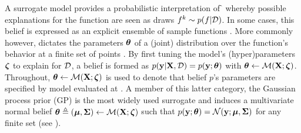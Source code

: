 A surrogate model \model{} provides a probabilistic interpretation of \f{} whereby possible explanations for the function are seen as draws \(f^{k} \sim p(f | \mathcal{D})\). In some cases, this belief is expressed as an explicit ensemble of sample functions \cite{hernandez-nips14,springenberg2016bayesian,wang2017max}. 
% 
More commonly however, \model{} dictates the parameters \(\boldsymbol{\theta}\) of a (joint) distribution over the function's behavior at a finite set of points \X{}. 
% 
By first tuning the model's (hyper)parameters \(\boldsymbol{\zeta}\) to explain for \(\mathcal{D}\), a belief is formed as \(p(\mathbf{y}|\mathbf{X}, \mathcal{D}) = p(\mathbf{y}; \boldsymbol{\theta})\) with \(\boldsymbol{\theta} \gets \mathcal{M}(\mathbf{X}; \boldsymbol{\zeta})\). Throughout, \(\boldsymbol{\theta} \gets \mathcal{M}(\mathbf{X}; \boldsymbol{\zeta})\) is used to denote that belief \(p\)'s parameters \rparams{} are specified by model \model{} evaluated at \X.
% 
A member of this latter category, the Gaussian process prior (GP) is the most widely used surrogate and induces a multivariate normal belief \(\boldsymbol{\theta} \triangleq (\boldsymbol{\mu},\boldsymbol{\Sigma}) \gets \mathcal{M}(\mathbf{X}; \boldsymbol{\zeta})\) such that \(p(\mathbf{y}; \boldsymbol{\theta}) = \mathcal{N}(\mathbf{y}; \boldsymbol{\mu}, \boldsymbol{\Sigma})\) for any finite set \X{} (see ).


